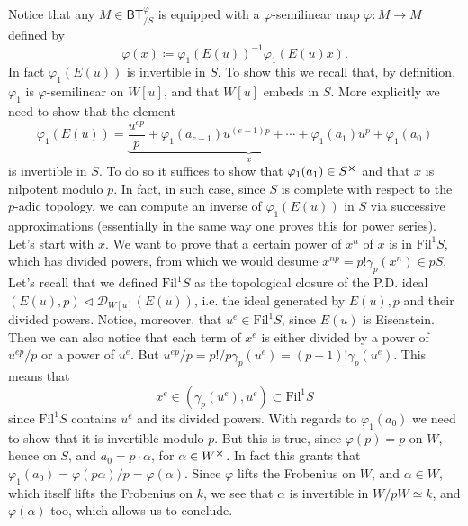 \begin{rem}[]\label{invertibilityphi1E(u))}
	Notice that any $M \in \mathsf{BT}^{\varphi}_{/S}$ is equipped with a 
	$\varphi$-semilinear map $\varphi\colon M \to M$ defined by
	\begin{equation*}
		\varphi (x) \coloneqq \varphi_1 \left( E(u) \right)^{-1} \varphi_1 (E(u)x)
	.\end{equation*}
	In fact $\varphi_1(E(u))$ is invertible in $S$.
	To show this we recall that, by definition, $\varphi_1$ is
	$\varphi$-semilinear on $W[u]$, and that $W[u]$ embeds in $S$.
	More explicitly we need to show that the element
	\begin{equation*}
		\varphi_1(E(u)) =
		\underbrace{\frac{ u^{ep} }{ p } + \varphi_1(a_{e-1}) u^{(e-1)p} +
		\cdots + \varphi_1(a_1)u^p}_{x} + \varphi_1(a_0)
	\end{equation*}
	is invertible in $S$.
	To do so it suffices to show that $\varphi_1(a_1) \in S^{\cross}$ and
	that $x$ is nilpotent modulo $p$. 
	In fact, in such case, since $S$ is complete with respect to the
	$p$-adic topology, we can compute an inverse of $\varphi_1(E(u))$
	in $S$ via successive approximations (essentially in the same
	way one proves this for power series).
	Let's start with $x$.
	We want to prove that a certain power of $x^n$ of $x$
	is in $\mathrm{Fil}^1S$, which has divided powers,
	from which we would desume $x^{np} = p! \gamma_p(x^n) \in pS$.
	Let's recall that we defined $\mathrm{Fil}^1S$ as the topological
	closure of the P.D. ideal $(E(u),p) \triangleleft \mathcal{D}_{W[u]}(E(u))$,
	i.e. the ideal generated by $E(u), p$ and their divided powers.
	Notice, moreover, that $u^e \in \mathrm{Fil}^1S$, since $E(u)$ is
	Eisenstein.
	Then we can also notice that each term of $x^e$ is either divided by
	a power of $u^{ep}/p$ or a power of $u^e$.
	But $u^{ep}/p = p!/p \gamma_p(u^e) = (p-1)! \gamma_p(u^e)$.
	This means that
	\begin{equation*}
		x^e \in \left( \gamma_p(u^e), u^e \right) \subset \mathrm{Fil}^1S
	\end{equation*}
	since $\mathrm{Fil}^1S$ contains $u^e$ and its divided powers.
	With regards to $\varphi_1(a_0)$ we need to show that it 
	is invertible modulo $p$.
	But this is true, since $\varphi(p) = p$ on $W$, hence on $S$,
	and $a_0 = p \cdot \alpha$, for $\alpha \in W^{\cross}$.
	In fact this grants that $\varphi_1(a_0) = \varphi(p \alpha)/p = \varphi(\alpha)$.
	Since $\varphi$ lifts the Frobenius on $W$, and $\alpha \in W$,
	which itself lifts the Frobenius on $k$, we see that $\alpha$
	is invertible in $W/pW \simeq k$, and $\varphi(\alpha)$ too,
	which allows us to conclude.
\end{rem}


